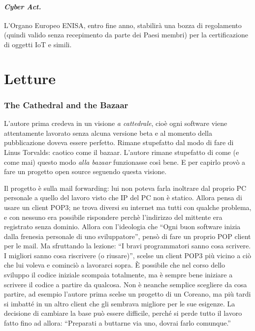 \documentclass[a4page, 11pt, twocolumn]{article}
\begin{document}
\subsection{\textit{Cyber Act.}}
L'Organo Europeo ENISA, entro fine anno, stabilirà una bozza di regolamento (quindi valido senza recepimento da parte dei Paesi membri) per la certificazione di oggetti IoT e simili.

\newpage
\part*{Letture}

\section{The Cathedral and the Bazaar}
L'autore prima credeva in un visione \textit{a cattedrale}, cioè ogni software viene attentamente lavorato senza alcuna versione beta e al momento della pubblicazione doveva essere perfetto.
Rimane stupefatto dal modo di fare di Linus Torvalds: caotico come il bazaar.
L'autore rimane stupefatto di come (e come mai) questo modo \textit{alla bazaar} funzionasse così bene.
E per capirlo provò a fare un progetto open source seguendo questa visione.

Il progetto è sulla mail forwarding: lui non poteva farla inoltrare dal proprio PC personale a quello del lavoro visto che IP del PC non è
statico.
Allora pensa di usare un client POP3; ne trova diversi su internet ma tutti con qualche problema, e con nessuno era possibile rispondere perchè l'indirizzo del mittente era registrato senza dominio.
Allora con l'ideologia che ``Ogni buon software inizia dalla frenesia personale di uno sviluppatore'', pensò di fare un proprio POP client per le mail.
Ma sfruttando la lezione: ``I bravi programmatori sanno cosa scrivere. I migliori sanno cosa riscrivere (o riusare)'', scelse un client POP3 più vicino a ciò che lui voleva e cominciò a lavorarci sopra.
È possibile che nel corso dello sviluppo il codice iniziale scompaia totalmente, ma è sempre bene iniziare a scrivere il codice a partire da qualcosa.
Non è neanche semplice scegliere da cosa partire, ad esempio l'autore prima scelse un progetto di un Coreano, ma più tardi si imbatté in un altro client che gli sembrava migliore per le sue esigenze.
La decisione di cambiare la base può essere difficile, perché si perde tutto il lavoro fatto fino ad allora: ``Preparati a buttarne via uno, dovrai farlo comunque.''
\end{document}
